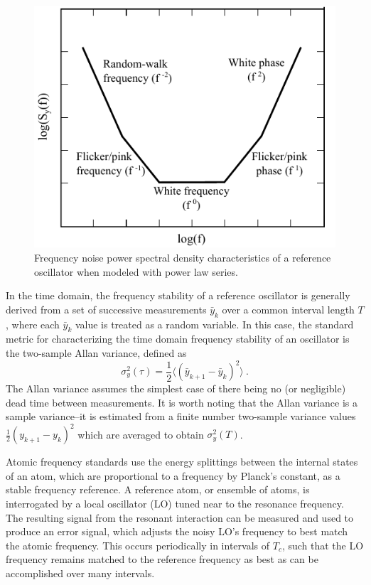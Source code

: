 \begin{figure}[tb]
    \begin{center}
        \includegraphics{figures/5/Fig_powerlaw}
        \caption{\label{fig:PSDmodel} Frequency noise power spectral density characteristics of a reference oscillator when modeled with power law series.}
    \end{center}
\end{figure}

In the time domain, the frequency stability of a reference oscillator is generally derived from a set of successive measurements $\bar{y}_k$ over a common interval length $T$, where each $\bar{y}_k$ value is treated as a random variable. In this case, the standard metric for characterizing the time domain frequency stability of an oscillator is the two-sample Allan variance, defined as \cite{5570702, Allan}
\begin{equation}
\sigma_y^2 (\tau) = \frac{1}{2} \big\langle(\bar{y}_{k+1} - \bar{y}_k)^2 \big\rangle \ \text{.}
\end{equation}
The Allan variance assumes the simplest case of there being no (or negligible) dead time between measurements. It is worth noting that the Allan variance is a sample variance--it is estimated from a finite number two-sample variance values $\frac{1}{2} (y_{k+1} - y_k)^2$ which are averaged to obtain $\sigma_y^2 (T)$.


Atomic frequency standards use the energy splittings between the internal states of an atom, which are proportional to a frequency by Planck's constant, as a stable frequency reference. %
A reference atom, or ensemble of atoms, is interrogated by a local oscillator (LO) tuned near to the resonance frequency. The resulting signal from the resonant interaction can be measured and used to produce an error signal, which adjusts the noisy LO's frequency to best match the atomic frequency. This occurs periodically in intervals of $T_c$, such that the LO frequency remains matched to the reference frequency as best as can be accomplished over many intervals.

